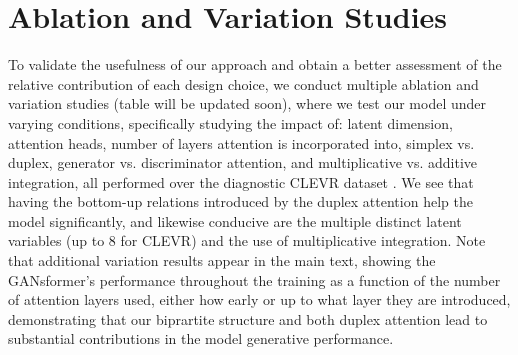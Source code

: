 \documentclass{article}
\begin{document}
\section{Ablation and Variation Studies}
\label{abltsec}
To validate the usefulness of our approach and obtain a better assessment of the relative contribution of each design choice, we conduct multiple ablation and variation studies (table will be updated soon), where we test our model under varying conditions, specifically studying the impact of: latent dimension, attention heads, number of layers attention is incorporated into, simplex vs. duplex, generator vs. discriminator attention, and multiplicative vs. additive integration, all performed over the diagnostic CLEVR dataset \citep{clevr}. We see that having the bottom-up relations introduced by the duplex attention help the model significantly, and likewise conducive are the multiple distinct latent variables (up to 8 for CLEVR) and the use of multiplicative integration. Note that additional variation results appear in the main text, showing the GANsformer's performance throughout the training as a function of the number of attention layers used, either how early or up to what layer they are introduced, demonstrating that our biprartite structure and both duplex attention lead to substantial contributions in the model generative performance.
\end{document}

